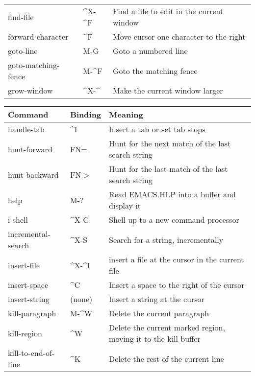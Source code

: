 \begin{tabular}{llp{287pt}}
find-file &  \^{}X-\^{}F & Find a file to edit in the current window\\

forward-character &  \^{}F & Move cursor one character to the right\\

goto-line &  M-G & Goto a numbered line\\

goto-matching-fence &  M-\^{}F & Goto the matching fence\\

grow-window &  \^{}X-\^{} & Make the current window larger\\
\end{tabular}

\begin{tabular}{llp{283pt}}
Command & Binding & Meaning\\ \hline
handle-tab &  \^{}I & Insert a tab or set tab stops\\

hunt-forward &  FN= & Hunt for the next match of the last
search string\\

hunt-backward &  FN$>${} & Hunt for the last match of the last
search string\\

help &  M-? & Read EMACS.HLP into a buffer and display it\\

i-shell  &  \^{}X-C & Shell up to a new command processor\\

incremental-search &  \^{}X-S & Search for a string, incrementally\\

insert-file &  \^{}X-\^{}I & insert a file at the cursor in the
current file\\

insert-space &  \^{}C & Insert a space to the right of the cursor\\

insert-string & (none) & Insert a string at the cursor\\

kill-paragraph &  M-\^{}W & Delete the current paragraph\\

kill-region &  \^{}W & Delete the current marked region, moving
it to the kill buffer\\

kill-to-end-of-line &  \^{}K & Delete the rest of the current line\\


\end{tabular}
